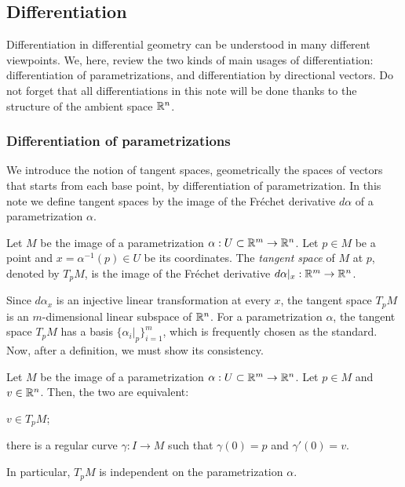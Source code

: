 \documentclass{../exp}
\def\a{\alpha}
\begin{document}
\subsection{Differentiation}
Differentiation in differential geometry can be understood in many different viewpoints.
We, here, review the two kinds of main usages of differentiation: differentiation of parametrizations, and differentiation by directional vectors.
Do not forget that all differentiations in this note will be done thanks to the structure of the ambient space $\mathbb{R}^n$.

\subsubsection{Differentiation of parametrizations}
We introduce the notion of tangent spaces, geometrically the spaces of vectors that starts from each base point, by differentiation of parametrization.
In this note we define tangent spaces by the image of the Fr\'echet derivative $d\a$ of a parametrization $\a$.

\begin{defn}
Let $M$ be the image of a parametrization $\a:U\subset\R^m\to\R^n$.
Let $p\in M$ be a point and $x=\a^{-1}(p)\in U$ be its coordinates.
The \emph{tangent space} of $M$ at $p$, denoted by $T_pM$, is the image of the Fr\'echet derivative $d\a|_x:\R^m\to\R^n$.
\end{defn}

Since $d\a_x$ is an injective linear transformation at every $x$, the tangent space $T_pM$ is an $m$-dimensional linear subspace of $\mathbb{R}^n$.
For a parametrization $\a$, the tangent space $T_pM$ has a basis $\{\a_i|_p\}_{i=1}^m$, which is frequently chosen as the standard.
Now, after a definition, we must show its consistency.

\begin{prop}
Let $M$ be the image of a parametrization $\a:U\subset\R^m\to\R^n$.
Let $p\in M$ and $v\in\mathbb{R}^n$.
Then, the two are equivalent:
\begin{cond}
\item $v\in T_pM$;
\item there is a regular curve $\gamma:I\to M$ such that $\gamma(0)=p$ and $\gamma'(0)=v.$
\end{cond}
In particular, $T_pM$ is independent on the parametrization $\a$.
\end{prop}
\begin{pf}
\end{pf}
\end{document}
